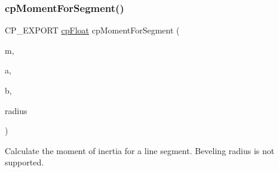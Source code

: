 \subsubsection{\texorpdfstring{cp\+Moment\+For\+Segment()}{cpMomentForSegment()}}
{\footnotesize\ttfamily C\+P\+\_\+\+E\+X\+P\+O\+RT \mbox{\hyperlink{group__basic_types_gac1ed65573e035bf892505768c852d8d3}{cp\+Float}} cp\+Moment\+For\+Segment (\begin{DoxyParamCaption}\item[{\mbox{\hyperlink{group__basic_types_gac1ed65573e035bf892505768c852d8d3}{cp\+Float}}}]{m,  }\item[{\mbox{\hyperlink{structcp_vect}{cp\+Vect}}}]{a,  }\item[{\mbox{\hyperlink{structcp_vect}{cp\+Vect}}}]{b,  }\item[{\mbox{\hyperlink{group__basic_types_gac1ed65573e035bf892505768c852d8d3}{cp\+Float}}}]{radius }\end{DoxyParamCaption})}

Calculate the moment of inertia for a line segment. Beveling radius is not supported. 